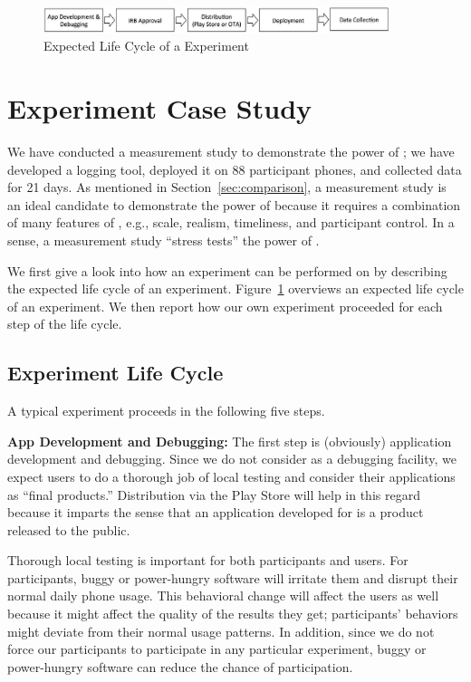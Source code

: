 \begin{figure}[t]
\centering
\includegraphics[width=0.9\textwidth]{./figures/static/experiment-life-cycle.pdf}
\caption{Expected Life Cycle of a \PhoneLab{} Experiment}
\label{fig:experiment-life-cycle}
\end{figure}

\section{Experiment Case Study}
\label{sec-experiment}

We have conducted a measurement study to demonstrate the power of \PhoneLab{};
we have developed a logging tool, deployed it on 88 participant phones, and
collected data for 21 days. As mentioned in Section~\ref{sec:comparison}, 
a measurement study is an ideal candidate to demonstrate the power of
\PhoneLab{} because it requires a combination of many features of \PhoneLab{},
e.g., scale, realism, timeliness, and participant control. In a sense, a
measurement study ``stress tests'' the power of \PhoneLab{}.

We first give a look into how an experiment can be performed on \PhoneLab{} by
describing the expected life cycle of an experiment.
Figure~\ref{fig:experiment-life-cycle} overviews an expected life cycle of an
experiment. We then report how our own experiment proceeded for each step of the
life cycle.

\subsection{Experiment Life Cycle}

A typical \PhoneLab{} experiment proceeds in the following five steps.

{\bf App Development and Debugging:} The first step is (obviously) application
development and debugging. Since we do not consider \PhoneLab{} as a debugging
facility, we expect \PhoneLab{} users to do a thorough job of local testing and
consider their applications as ``final products.'' Distribution via the Play
Store will help in this regard because it imparts the sense that an application
developed for \PhoneLab{} is a product released to the public.

Thorough local testing is important for both \PhoneLab{} participants and users.
For participants, buggy or power-hungry software will irritate them and disrupt
their normal daily phone usage. This behavioral change will affect the users as
well because it might affect the quality of the results they get; participants'
behaviors might deviate from their normal usage patterns. In addition, since we
do not force our participants to participate in any particular experiment, buggy
or power-hungry software can reduce the chance of participation.

